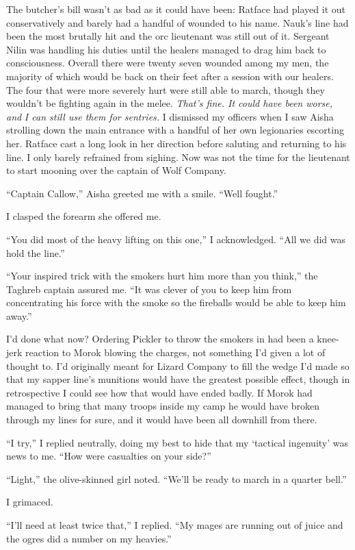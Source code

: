 \documentclass[12pt, openany]{book}
\begin{document}
The butcher’s bill wasn’t as bad as it could have been: Ratface had played it out conservatively and barely had a handful of wounded to his name. Nauk’s line had been the most brutally hit and the orc lieutenant was still out of it. Sergeant Nilin was handling his duties until the healers managed to drag him back to consciousness. Overall there were twenty seven wounded among my men, the majority of which would be back on their feet after a session with our healers. The four that were more severely hurt were still able to march, though they wouldn’t be fighting again in the melee. \textit{That’s fine. It could have been worse, and} \textit{I can still use them for sentries. }I dismissed my officers when I saw Aisha strolling down the main entrance with a handful of her own legionaries escorting her. Ratface cast a long look in her direction before saluting and returning to his line. I only barely refrained from sighing. Now was not the time for the lieutenant to start mooning over the captain of Wolf Company.

“Captain Callow,” Aisha greeted me with a smile. “Well fought.”

I clasped the forearm she offered me. 

“You did most of the heavy lifting on this one,” I acknowledged. “All we did was hold the line.”

“Your inspired trick with the smokers hurt him more than you think,” the Taghreb captain assured me. “It was clever of you to keep him from concentrating his force with the smoke so the fireballs would be able to keep him away.”

I’d done what now? Ordering Pickler to throw the smokers in had been a knee-jerk reaction to Morok blowing the charges, not something I’d given a lot of thought to. I’d originally meant for Lizard Company to fill the wedge I’d made so that my sapper line’s munitions would have the greatest possible effect, though in retrospective I could see how that would have ended badly. If Morok had managed to bring that many troops inside my camp he would have broken through my lines for sure, and it would have been all downhill from there.

“I try,” I replied neutrally, doing my best to hide that my ‘tactical ingenuity’ was news to me. “How were casualties on your side?” 

“Light,” the olive-skinned girl noted. “We’ll be ready to march in a quarter bell.”

I grimaced.

“I’ll need at least twice that,” I replied. “My mages are running out of juice and the ogres did a number on my heavies.”
\end{document}
